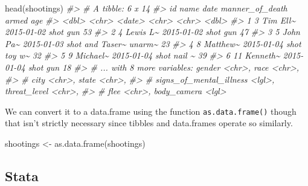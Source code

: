 \documentclass[
]{krantz}
\makeatletter
\newenvironment{Shaded}{\begin{snugshade}}{\end{snugshade}}
\newcommand{\CommentTok}[1]{\textcolor[rgb]{0.37,0.37,0.37}{\textit{#1}}}
\newcommand{\FunctionTok}[1]{\textcolor[rgb]{0,0,0}{#1}}
\newcommand{\NormalTok}[1]{#1}
\newcommand{\OtherTok}[1]{\textcolor[rgb]{0.37,0.37,0.37}{#1}}
\newenvironment{kframe}{%
\medskip{}
\setlength{\fboxsep}{.8em}
 \def\at@end@of@kframe{}%
 \ifinner\ifhmode%
  \def\at@end@of@kframe{\end{minipage}}%
  \begin{minipage}{\columnwidth}%
 \fi\fi%
 \def\FrameCommand##1{\hskip\@totalleftmargin \hskip-\fboxsep
 \colorbox{shadecolor}{##1}\hskip-\fboxsep
     \hskip-\linewidth \hskip-\@totalleftmargin \hskip\columnwidth}%
 \MakeFramed {\advance\hsize-\width
   \@totalleftmargin\z@ \linewidth\hsize
   \@setminipage}}%
 {\par\unskip\endMakeFramed%
 \at@end@of@kframe}
\renewenvironment{Shaded}{\begin{kframe}}{\end{kframe}}
\makeatother
\begin{document}
\begin{Shaded}
\begin{Highlighting}[]
\FunctionTok{head}\NormalTok{(shootings)}
\CommentTok{\#\textgreater{} \# A tibble: 6 x 14}
\CommentTok{\#\textgreater{}      id name     date       manner\_of\_death armed    age}
\CommentTok{\#\textgreater{}   \textless{}dbl\textgreater{} \textless{}chr\textgreater{}    \textless{}date\textgreater{}     \textless{}chr\textgreater{}           \textless{}chr\textgreater{}  \textless{}dbl\textgreater{}}
\CommentTok{\#\textgreater{} 1     3 Tim Ell\textasciitilde{} 2015{-}01{-}02 shot            gun       53}
\CommentTok{\#\textgreater{} 2     4 Lewis L\textasciitilde{} 2015{-}01{-}02 shot            gun       47}
\CommentTok{\#\textgreater{} 3     5 John Pa\textasciitilde{} 2015{-}01{-}03 shot and Taser\textasciitilde{} unarm\textasciitilde{}    23}
\CommentTok{\#\textgreater{} 4     8 Matthew\textasciitilde{} 2015{-}01{-}04 shot            toy w\textasciitilde{}    32}
\CommentTok{\#\textgreater{} 5     9 Michael\textasciitilde{} 2015{-}01{-}04 shot            nail \textasciitilde{}    39}
\CommentTok{\#\textgreater{} 6    11 Kenneth\textasciitilde{} 2015{-}01{-}04 shot            gun       18}
\CommentTok{\#\textgreater{} \# ... with 8 more variables: gender \textless{}chr\textgreater{}, race \textless{}chr\textgreater{},}
\CommentTok{\#\textgreater{} \#   city \textless{}chr\textgreater{}, state \textless{}chr\textgreater{},}
\CommentTok{\#\textgreater{} \#   signs\_of\_mental\_illness \textless{}lgl\textgreater{}, threat\_level \textless{}chr\textgreater{},}
\CommentTok{\#\textgreater{} \#   flee \textless{}chr\textgreater{}, body\_camera \textless{}lgl\textgreater{}}
\end{Highlighting}
\end{Shaded}

We can convert it to a data.frame using the function \texttt{as.data.frame()} though that isn't strictly necessary since tibbles and data.frames operate so similarly.

\begin{Shaded}
\begin{Highlighting}[]
\NormalTok{shootings }\OtherTok{\textless{}{-}} \FunctionTok{as.data.frame}\NormalTok{(shootings)}
\end{Highlighting}
\end{Shaded}

\hypertarget{stata}{%
\subsection{Stata}\label{stata}}
\end{document}
